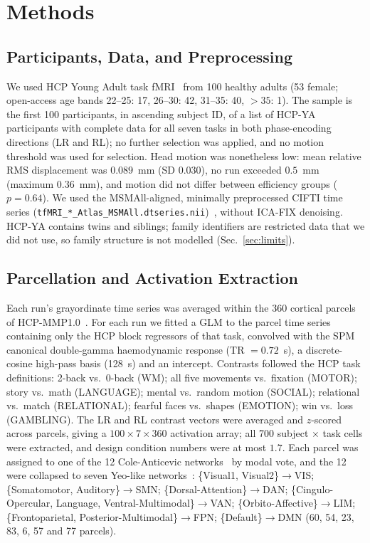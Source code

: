 \documentclass[conference]{IEEEtran}
\begin{document}
\section{Methods}

\subsection{Participants, Data, and Preprocessing}

We used HCP Young Adult task fMRI~\cite{van2013wu} from 100 healthy adults (53 female; open-access age bands 22--25: 17, 26--30: 42, 31--35: 40, $>35$: 1). The sample is the first 100 participants, in ascending subject ID, of a list of HCP-YA participants with complete data for all seven tasks in both phase-encoding directions (LR and RL); no further selection was applied, and no motion threshold was used for selection. Head motion was nonetheless low: mean relative RMS displacement was $0.089$~mm (SD $0.030$), no run exceeded $0.5$~mm (maximum $0.36$~mm), and motion did not differ between efficiency groups ($p = 0.64$). We used the MSMAll-aligned, minimally preprocessed CIFTI time series (\texttt{tfMRI\_*\_Atlas\_MSMAll.dtseries.nii})~\cite{glasser2013minimal,robinson2014msm}, without ICA-FIX denoising. HCP-YA contains twins and siblings; family identifiers are restricted data that we did not use, so family structure is not modelled (Sec.~\ref{sec:limits}).

\subsection{Parcellation and Activation Extraction}

Each run's grayordinate time series was averaged within the 360 cortical parcels of HCP-MMP1.0~\cite{glasser2016multi}. For each run we fitted a GLM to the parcel time series containing only the HCP block regressors of that task, convolved with the SPM canonical double-gamma haemodynamic response (TR $= 0.72$~s), a discrete-cosine high-pass basis (128~s) and an intercept. Contrasts followed the HCP task definitions: 2-back vs.\ 0-back (WM); all five movements vs.\ fixation (MOTOR); story vs.\ math (LANGUAGE); mental vs.\ random motion (SOCIAL); relational vs.\ match (RELATIONAL); fearful faces vs.\ shapes (EMOTION); win vs.\ loss (GAMBLING). The LR and RL contrast vectors were averaged and $z$-scored across parcels, giving a $100 \times 7 \times 360$ activation array; all 700 subject $\times$ task cells were extracted, and design condition numbers were at most $1.7$. Each parcel was assigned to one of the 12 Cole-Anticevic networks~\cite{ji2019mapping} by modal vote, and the 12 were collapsed to seven Yeo-like networks~\cite{yeo2011organization}: \{Visual1, Visual2\}$\to$VIS; \{Somatomotor, Auditory\}$\to$SMN; \{Dorsal-Attention\}$\to$DAN; \{Cingulo-Opercular, Language, Ventral-Multimodal\}$\to$VAN; \{Orbito-Affective\}$\to$LIM; \{Frontoparietal, Posterior-Multimodal\}$\to$FPN; \{Default\}$\to$DMN (60, 54, 23, 83, 6, 57 and 77 parcels).
\end{document}
